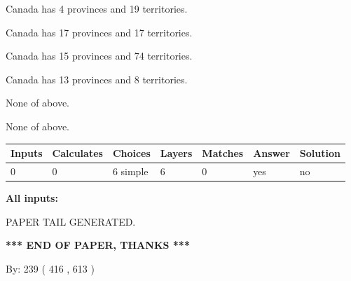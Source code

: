 \documentclass[12pt]{article}
\begin{document}
 
Canada has   4 provinces and  19 territories.
 
 
Canada has  17 provinces and  17 territories.
 
 
Canada has  15 provinces and  74 territories.
 
 
Canada has  13 provinces and  8 territories.
 
 
 None of above.
 
 
\noindent{}
 
 
 None of above.
 
 
\noindent{}
 
 
   
   
   
   
\noindent\begin{tabular}{|l|l|l|l|l|l|l|}
 \hline
Inputs & Calculates & Choices & Layers & Matches & Answer & Solution \\ \hline
 0  & 
 0  & 
 6
  simple  
  & 
 6  & 
 0  & 
  yes & 
  no 
  \\ \hline
 \end{tabular}
   
   
   
   
\noindent{}
   
   
   
   
\noindent\vspace{0.1in}\hspace{-0.08in} {\textbf{\Large{All inputs: }}}
   
   
   
   
   
   
 \vspace{0.2in}
 
   
   
\vspace{2.0in} PAPER TAIL GENERATED.
   
   
   
   
\vspace{1.0in} 
{\textbf{\large{ *** END OF PAPER, THANKS *** }}} 
   
   
\hspace{1.0in} By: 
 239 ( 416 ,  613 )
   
\end{document}
